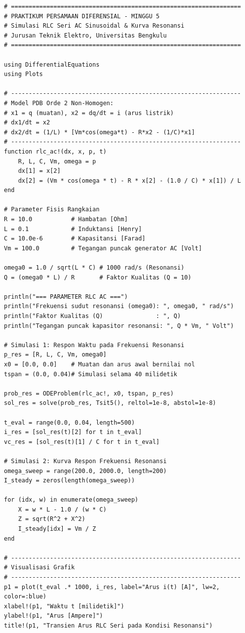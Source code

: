 \documentclass[11pt,a4paper]{article}
\theoremstyle{definition}
\begin{document}
\begin{lstlisting}[style=juliastyle, caption={Simulasi Lengkap Transien RLC Seri AC dan Kurva Resonansi dengan Julia.}, label={lst:julia_rlc_ac}]
# =================================================================
# PRAKTIKUM PERSAMAAN DIFERENSIAL - MINGGU 5
# Simulasi RLC Seri AC Sinusoidal & Kurva Resonansi
# Jurusan Teknik Elektro, Universitas Bengkulu
# =================================================================

using DifferentialEquations
using Plots

# -----------------------------------------------------------------
# Model PDB Orde 2 Non-Homogen:
# x1 = q (muatan), x2 = dq/dt = i (arus listrik)
# dx1/dt = x2
# dx2/dt = (1/L) * [Vm*cos(omega*t) - R*x2 - (1/C)*x1]
# -----------------------------------------------------------------
function rlc_ac!(dx, x, p, t)
    R, L, C, Vm, omega = p
    dx[1] = x[2]
    dx[2] = (Vm * cos(omega * t) - R * x[2] - (1.0 / C) * x[1]) / L
end

# Parameter Fisis Rangkaian
R = 10.0           # Hambatan [Ohm]
L = 0.1            # Induktansi [Henry]
C = 10.0e-6        # Kapasitansi [Farad]
Vm = 100.0         # Tegangan puncak generator AC [Volt]

omega0 = 1.0 / sqrt(L * C) # 1000 rad/s (Resonansi)
Q = (omega0 * L) / R       # Faktor Kualitas (Q = 10)

println("=== PARAMETER RLC AC ===")
println("Frekuensi sudut resonansi (omega0): ", omega0, " rad/s")
println("Faktor Kualitas (Q)               : ", Q)
println("Tegangan puncak kapasitor resonansi: ", Q * Vm, " Volt")

# Simulasi 1: Respon Waktu pada Frekuensi Resonansi
p_res = [R, L, C, Vm, omega0]
x0 = [0.0, 0.0]    # Muatan dan arus awal bernilai nol
tspan = (0.0, 0.04)# Simulasi selama 40 milidetik

prob_res = ODEProblem(rlc_ac!, x0, tspan, p_res)
sol_res = solve(prob_res, Tsit5(), reltol=1e-8, abstol=1e-8)

t_eval = range(0.0, 0.04, length=500)
i_res = [sol_res(t)[2] for t in t_eval]
vc_res = [sol_res(t)[1] / C for t in t_eval]

# Simulasi 2: Kurva Respon Frekuensi Resonansi
omega_sweep = range(200.0, 2000.0, length=200)
I_steady = zeros(length(omega_sweep))

for (idx, w) in enumerate(omega_sweep)
    X = w * L - 1.0 / (w * C)
    Z = sqrt(R^2 + X^2)
    I_steady[idx] = Vm / Z
end

# -----------------------------------------------------------------
# Visualisasi Grafik
# -----------------------------------------------------------------
p1 = plot(t_eval .* 1000, i_res, label="Arus i(t) [A]", lw=2, color=:blue)
xlabel!(p1, "Waktu t [milidetik]")
ylabel!(p1, "Arus [Ampere]")
title!(p1, "Transien Arus RLC Seri pada Kondisi Resonansi")


\end{lstlisting}
\end{document}
